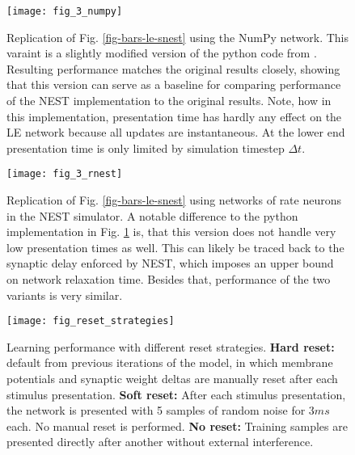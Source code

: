 \renewcommand{\thefigure}{S\arabic{figure}}
\begin{figure}[h!]
  \centering
  \texttt{[image: fig\_3\_numpy]}
  \caption[Replication of Fig. \ref{fig-bars-le-snest} using the NumPy network]{Replication of Fig.
    \ref{fig-bars-le-snest} using the NumPy network. This varaint is a slightly modified version of the python code from
    \citep{Haider2021}. Resulting performance matches the original results closely, showing that this version can serve
    as a baseline for comparing performance of the NEST implementation to the original results. Note, how in this
    implementation, presentation time has hardly any effect on the LE network because all updates are instantaneous. At
    the lower end presentation time is only limited by simulation timestep $\Delta t$.}
  \label{fig-bars-le-numpy}
\end{figure}


\begin{figure}[h!]
  \centering
  \texttt{[image: fig\_3\_rnest]}
  \caption[Replication of Fig. \ref{fig-bars-le-snest} using networks of rate neurons in the NEST simulator]{Replication
    of Fig. \ref{fig-bars-le-snest} using networks of rate neurons in the NEST simulator. A notable difference to the
    python implementation in Fig. \ref{fig-bars-le-numpy} is, that this version does not handle very low presentation
    times as well. This can likely be traced back to the synaptic delay enforced by NEST, which imposes an upper bound
    on network relaxation time. Besides that, performance of the two variants is very similar.}
  \label{fig-bars-le-rnest}
\end{figure}


\begin{figure}[h!]
  \centering
  \texttt{[image: fig\_reset\_strategies]}
  \caption[Learning performance with different reset strategies.]{Learning performance with different reset strategies.
    \textbf{Hard reset:} default from previous iterations of the model, in which membrane potentials and synaptic weight
    deltas are manually reset after each stimulus presentation. \textbf{Soft reset:} After each stimulus presentation,
    the network is presented with 5 samples of random noise for $3ms$ each. No manual reset is performed. \textbf{No
    reset:} Training samples are presented directly after another without external interference. }
  \label{fig-reset-strategies}
\end{figure}

